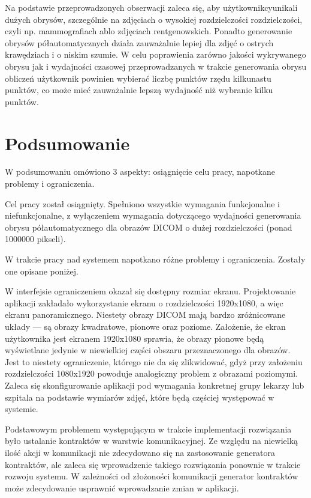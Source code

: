 \documentclass[a4paper,11pt,twoside,openright]{report}
\newcommand\blankpage{%
    \null
    \thispagestyle{empty}%
    \newpage}
\theoremstyle{definition}
\begin{document}
Na podstawie przeprowadzonych obserwacji zaleca się, aby użytkownikcyunikali
dużych obrysów, szczególnie na zdjęciach o wysokiej rozdzielczości rozdzielczości,
czyli np. mammografiach ablo zdjęciach rentgenowskich. Ponadto generowanie obrysów
półautomatycznych działa zauważalnie lepiej dla zdjęć o ostrych krawędziach i o
niskim szumie. W celu poprawienia zarówno jakości wykrywanego obrysu jak i
wydajności czasowej przeprowadzanych w trakcie generowania obrysu obliczeń użytkownik
powinien wybierać liczbę punktów rzędu kilkunastu punktów, co może mieć zauważalnie
lepszą wydajność niż wybranie kilku punktów.

\afterpage{\blankpage}
\chapter {Podsumowanie}

W podsumowaniu omówiono 3 aspekty: osiągnięcie celu pracy, napotkane problemy i
ograniczenia.

Cel pracy został osiągnięty. Spełniono wszystkie wymagania funkcjonalne i niefunkcjonalne,
z wyłączeniem wymagania dotyczącego wydajności generowania obrysu półautomatycznego
dla obrazów DICOM o dużej rozdzielczości (ponad 1000000 pikseli).

W trakcie pracy nad systemem napotkano różne problemy i ograniczenia. Zostały one
opisane poniżej.

W interfejsie ograniczeniem okazał się dostępny rozmiar ekranu. Projektowanie
aplikacji zakładało wykorzystanie ekranu o rozdzielczości 1920x1080, a więc ekranu
panoramicznego. Niestety obrazy DICOM mają bardzo zróżnicowane układy --- są obrazy
kwadratowe, pionowe oraz poziome. Założenie, że ekran użytkownika jest ekranem
1920x1080 sprawia, że obrazy pionowe będą wyświetlane jedynie w niewielkiej
części obszaru przeznaczonego dla obrazów. Jest to niestety ograniczenie, którego
nie da się zlikwidować, gdyż przy założeniu rozdzielczości 1080x1920 powoduje
analogiczny problem z obrazami poziomymi. Zaleca się skonfigurowanie aplikacji
pod wymagania konkretnej grupy lekarzy lub szpitala na podstawie wymiarów zdjęć,
które będą częściej występować w systemie.


Podstawowym problemem występującym w trakcie implementacji rozwiązania było
ustalanie kontraktów w warstwie komunikacyjnej. Ze względu na niewielką ilość
akcji w komunikacji nie zdecydowano się na zastosowanie generatora kontraktów,
ale zaleca się wprowadzenie takiego rozwiązania ponownie w trakcie rozwoju systemu.
W zależności od złożoności komunikacji generator kontraktów może zdecydowanie
usprawnić wprowadzanie zmian w aplikacji.
\end{document}
